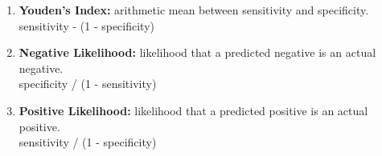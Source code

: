 \documentclass[a4paper,12pt, english]{article}
\begin{document}
\begin{enumerate}
\begin{enumerate}
\item \textbf{Youden's Index: }  
arithmetic mean between sensitivity and specificity.\\
sensitivity - (1 - specificity)

\item \textbf{Negative Likelihood: }  
likelihood that a predicted negative is an actual negative.\\
specificity / (1 - sensitivity)

\item \textbf{Positive Likelihood: }  
likelihood that a predicted positive is an actual positive.\\
sensitivity / (1 - specificity)

\end{enumerate}

\end{enumerate}


    

    
\end{document}
